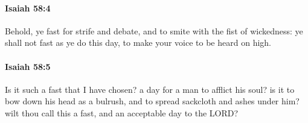 		\paragraph{Isaiah 58:4} %
			\label{ISAIAH-58-4}

			Behold, ye fast for strife and debate, and to smite with the fist of wickedness: ye shall not fast as ye do this day, to make your voice to be heard on high.


		\paragraph{Isaiah 58:5} %
			\label{ISAIAH-58-5}

			Is it such a fast that I have chosen? a day for a man to afflict his soul? is it to bow down his head as a bulrush, and to spread sackcloth and ashes under him? wilt thou call this a fast, and an acceptable day to the LORD?


